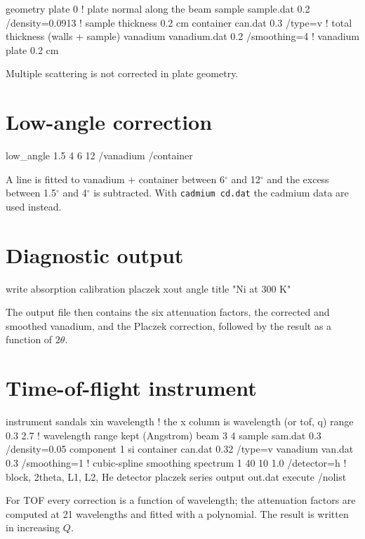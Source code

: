 \documentclass[11pt,a4paper]{report}
\newcommand{\cmd}[1]{\texttt{\color{accent}#1}}
\newcommand{\file}[1]{\texttt{#1}}
\begin{document}
\begin{com}
geometry plate 0                       ! plate normal along the beam
sample sample.dat 0.2 /density=0.0913  ! sample thickness 0.2 cm
container can.dat 0.3 /type=v          ! total thickness (walls + sample)
vanadium vanadium.dat 0.2 /smoothing=4 ! vanadium plate 0.2 cm
\end{com}
Multiple scattering is not corrected in plate geometry.

\section{Low-angle correction}

\begin{com}
low_angle 1.5 4 6 12 /vanadium /container
\end{com}
A line is fitted to vanadium + container between 6$^\circ$ and 12$^\circ$ and
the excess between 1.5$^\circ$ and 4$^\circ$ is subtracted. With
\cmd{cadmium}~\file{cd.dat} the cadmium data are used instead.

\section{Diagnostic output}

\begin{com}
write absorption calibration placzek
xout angle
title "Ni at 300 K"
\end{com}
The output file then contains the six attenuation factors, the corrected and
smoothed vanadium, and the Placzek correction, followed by the result as a
function of $2\theta$.

\section{Time-of-flight instrument}

\begin{com}
instrument sandals
xin wavelength                 ! the x column is wavelength (or tof, q)
range 0.3 2.7                  ! wavelength range kept (Angstrom)
beam 3 4
sample sam.dat 0.3 /density=0.05
component 1 si
container can.dat 0.32 /type=v
vanadium van.dat 0.3 /smoothing=1     ! cubic-spline smoothing
spectrum 1 40 10 1.0 /detector=h      ! block, 2theta, L1, L2, He detector
placzek series
output out.dat
execute /nolist
\end{com}
For TOF every correction is a function of wavelength; the attenuation factors are
computed at 21 wavelengths and fitted with a polynomial. The result is written in
increasing $Q$.
\end{document}
